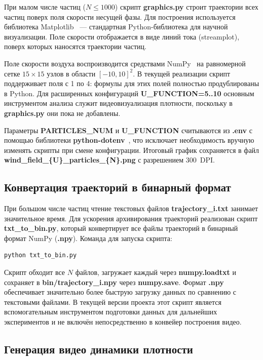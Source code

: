 \documentclass[14pt,a4paper]{extarticle}
\numberwithin{figure}{section}
\numberwithin{table}{section}
\begin{document}
При малом числе частиц ($N \leq 1000$) скрипт \textbf{graphics.py}
строит траектории всех частиц поверх поля скорости несущей фазы.
Для построения используется библиотека Matplotlib~\cite{Matplotlib}
--- стандартная Python-библиотека для научной визуализации.
Поле скорости отображается в виде линий тока (streamplot),
поверх которых наносятся траектории частиц.

Поле скорости воздуха воспроизводится средствами NumPy~\cite{NumPy}
на равномерной сетке $15 \times 15$ узлов в области $[-10,10]^2$.
В текущей реализации скрипт поддерживает поля с 1 по 4:
формулы для этих полей полностью продублированы в Python. Для расширенных
конфигураций \linebreak \textbf{U\_FUNCTION=5..10} основным инструментом анализа служит
видеовизуализация плотности, поскольку в \textbf{graphics.py} они пока не добавлены.

Параметры \textbf{PARTICLES\_NUM} и \textbf{U\_FUNCTION} считываются
из \textbf{.env} с помощью библиотеки \textbf{python-dotenv}~\cite{PythonDotenv},
что исключает необходимость вручную изменять скрипты при смене конфигурации.
Итоговый график сохраняется в файл
\textbf{wind\_field\_\{U\}\_particles\_\{N\}.png} с разрешением 300~DPI.

\subsection{Конвертация траекторий в бинарный формат}

При большом числе частиц чтение текстовых файлов \textbf{trajectory\_i.txt}
занимает значительное время. Для ускорения архивирования траекторий реализован скрипт
\textbf{txt\_to\_bin.py}, который конвертирует все файлы траекторий
в бинарный формат NumPy (\textbf{.npy}). Команда для запуска скрипта:

\begin{verbatim}
python txt_to_bin.py
\end{verbatim}

Скрипт обходит все $N$ файлов, загружает каждый через \textbf{numpy.loadtxt}
и сохраняет в \textbf{bin/trajectory\_i.npy} через \textbf{numpy.save}.
Формат \textbf{.npy}~\cite{NumPy} обеспечивает значительно более быструю
загрузку данных по сравнению с текстовыми файлами. В текущей версии проекта
этот скрипт является вспомогательным инструментом подготовки данных для
дальнейших экспериментов и не включён непосредственно в конвейер построения видео.

\subsection{Генерация видео динамики плотности}
\end{document}
